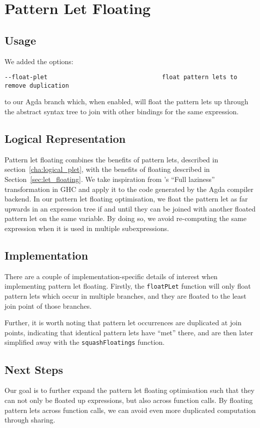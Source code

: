 \chapter{Pattern Let Floating}
\label{cha:plet-floating}

\section{Usage}

We added the options:

\begin{verbatim}
--float-plet                                float pattern lets to remove duplication
\end{verbatim}

to our Agda branch which, when enabled, will float the pattern lets up through the abstract syntax tree to join with other bindings for the same expression.

\section{Logical Representation}

Pattern let floating combines the benefits of pattern lets, described in section~\ref{cha:logical_plet}, with the benefits of floating described in Section~\ref{sec:let_floating}. We take inspiration from \citet{jones1996}'s ``Full laziness'' transformation in GHC and apply it to the code generated by the Agda compiler backend. In our pattern let floating optimisation, we float the pattern let as far upwards in an expression tree if and until they can be joined with another floated pattern let on the same variable.  By doing so, we avoid re-computing the same expression when it is used in multiple subexpressions.

\section{Implementation}

There are a couple of implementation-specific details of interest when implementing pattern let floating. Firstly, the \lstinline{floatPLet} function will only float pattern lets which occur in multiple branches, and they are floated to the least join point of those branches.

Further, it is worth noting that pattern let occurrences are duplicated at join points, indicating that identical pattern lets have ``met'' there, and are then later simplified away with the \lstinline{squashFloatings} function.

\section{Next Steps}

Our goal is to further expand the pattern let floating optimisation such that they can not only be floated up expressions, but also across function calls. By floating pattern lets across function calls, we can avoid even more duplicated computation through sharing.
